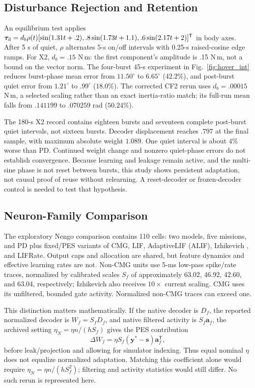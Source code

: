 \documentclass[letterpaper, 10 pt, conference]{ieeeconf}
\newcommand{\T}{^{\mathsf T}}
\begin{document}
\subsection{Disturbance Rejection and Retention}
\label{sec:disturbance}
An equilibrium test applies
$\bm\tau_{\rm d}=d_b\rho(t)[\sin(1.31t+.2),\allowbreak
.8\sin(1.73t+1.1),\allowbreak.6\sin(2.17t+2)]\T$ in body axes.
After 5 s of quiet, $\rho$ alternates 5-s on/off intervals with 0.25-s
raised-cosine edge ramps. For X2, $d_b=.15$ N\,m: the first component's
amplitude is .15 N\,m, not a bound on the vector norm.
The four-burst 45-s experiment in Fig.~\ref{fig:hover_int} reduces
burst-phase mean error from $11.50^\circ$ to $6.65^\circ$ ($42.2\%$),
and post-burst quiet error from $1.21^\circ$ to $.99^\circ$ ($18.0\%$).
The corrected CF2 rerun uses $d_b=.00015$ N\,m, a selected scaling rather
than an exact inertia-ratio match; its full-run mean falls from
$.141199$ to $.070259$ rad ($50.24\%$).

The 180-s X2 record contains eighteen bursts and seventeen complete
post-burst quiet intervals, not sixteen bursts. Decoder displacement
reaches $.797$ at the final sample, with maximum absolute weight $1.089$.
One quiet interval is about $4\%$ worse than PD. Continued weight change
and nonzero quiet-phase errors do not establish convergence. Because
learning and leakage remain active, and the multi-sine phase is not reset
between bursts, this study shows persistent adaptation, not causal proof
of reuse without relearning. A reset-decoder or frozen-decoder control is
needed to test that hypothesis.

\subsection{Neuron-Family Comparison}
The exploratory Nengo comparison contains 110 cells: two models, five
missions, and PD plus fixed/PES variants of CMG, LIF, AdaptiveLIF (ALIF),
Izhikevich \cite{izhikevich2003}, and LIFRate. Output caps and allocation
are shared, but feature dynamics and effective learning rates are not.
Non-CMG units use 5-ms low-pass spike/rate traces, normalized by calibrated
scales $S_f$ of approximately 63.02, 46.92, 42.60, and 63.04, respectively;
Izhikevich also receives $10\times$ current scaling. CMG uses its
unfiltered, bounded gate activity. Normalized non-CMG traces can exceed one.

This distinction matters mathematically. If the native decoder is $D_f$,
the reported normalized decoder is $W_f=S_fD_f$, and native filtered
activity is $S_f\bm a_f$, the archived setting
$\eta_N=\eta n/(hS_f)$ gives the PES contribution
\begin{equation}
 \Delta W_f=\eta S_f(\bm y^*-\bm s)\bm a_f\T,
 \label{eq:familyscale}
\end{equation}
before leak/projection and allowing for simulator indexing. Thus equal
nominal $\eta$ does not equalize normalized adaptation. Matching this
coefficient alone would require $\eta_N=\eta n/(hS_f^2)$; filtering and
activity statistics would still differ. No such rerun is represented here.
\end{document}
